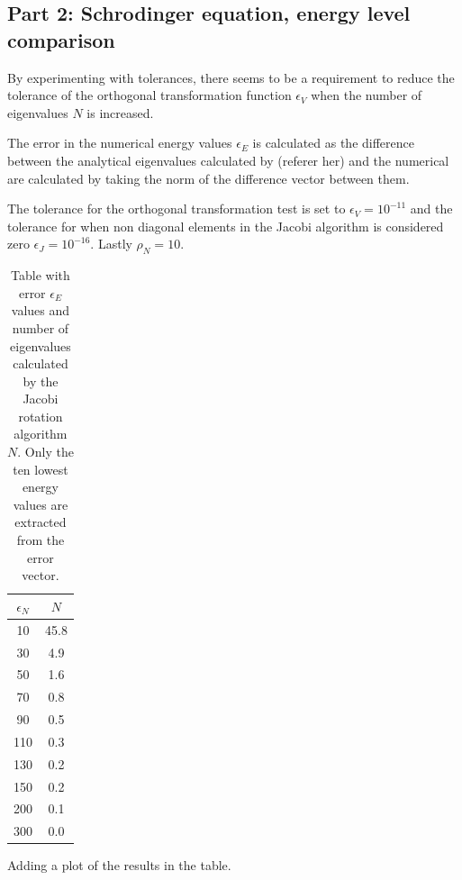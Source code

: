 \documentclass[aip,nobalancelastpage,
twocolumn,
rsi,%
 amsmath,amssymb,
 reprint,%
]{revtex4}
\begin{document}
\subsection{Part 2: Schrodinger equation, energy level comparison }
By experimenting with tolerances, there seems to be a requirement to reduce the tolerance of the orthogonal transformation function $\epsilon_V$ when the number of eigenvalues $N$ is increased.\par
The error in the numerical energy values $\epsilon_{E}$ is calculated as the difference between the analytical eigenvalues calculated by (referer her) and the numerical are calculated by taking the norm of the difference vector between them.\par
The tolerance for the orthogonal transformation test is set to $\epsilon_V=10^{-11}$ and the tolerance for when non diagonal elements in the Jacobi algorithm is considered zero $\epsilon_J=10^{-16}$. Lastly $\rho_N = 10$.

\begin{table}[H]
\center
\caption{Table with error $\epsilon_E$ values and number of eigenvalues calculated by the Jacobi rotation algorithm $N$. Only the ten lowest energy values are extracted from the error vector. }
\begin{tabular}{| c | c |}
\hline
$\epsilon_N$ & $N$\\
\hline
10 & 45.8\\
30 & 4.9\\
50 & 1.6\\
70 & 0.8\\
90 & 0.5\\
110 & 0.3\\
130 & 0.2\\
150 & 0.2\\
200 & 0.1\\
300 & 0.0\\
\hline
\end{tabular}
\label{part 2: table 1}
\end{table}
Adding a plot of the results in the table.
\end{document}
